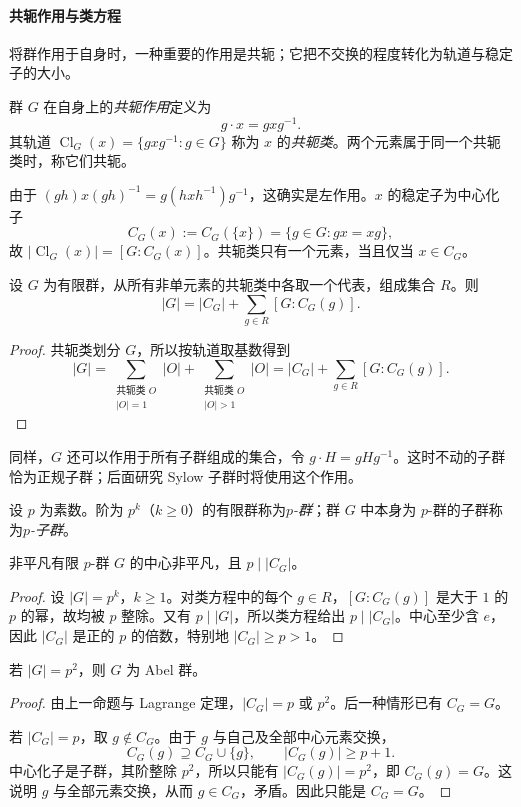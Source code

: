 \documentclass[lang=cn,a4paper,fontset=none,zihao=false,10pt,openany,twoside]{beautybook}
\numberwithin{algorithm}{chapter}
\begin{document}
\paragraph{共轭作用与类方程}
将群作用于自身时，一种重要的作用是共轭；它把不交换的程度转化为轨道与稳定子的大小。
\begin{definition}[共轭与共轭类]
群 $G$ 在自身上的\emph{共轭作用}定义为
\[
 g\cdot x=gxg^{-1}.
\]
其轨道 $\operatorname{Cl}_G(x)=\{gxg^{-1}:g\in G\}$ 称为 $x$ 的\emph{共轭类}。两个元素属于同一个共轭类时，称它们共轭。
\end{definition}
由于 $(gh)x(gh)^{-1}=g(hxh^{-1})g^{-1}$，这确实是左作用。$x$ 的稳定子为中心化子
\[
 C_G(x):=C_G(\{x\})=\{g\in G:gx=xg\},
\]
故 $|\operatorname{Cl}_G(x)|=[G:C_G(x)]$。共轭类只有一个元素，当且仅当 $x\in C_G$。

\begin{proposition}[类方程]\label{prop:class-equation}
设 $G$ 为有限群，从所有非单元素的共轭类中各取一个代表，组成集合 $R$。则
\[
 |G|=|C_G|+\sum_{g\in R}[G:C_G(g)].
\]
\end{proposition}
\begin{proof}
共轭类划分 $G$，所以按轨道取基数得到
\[
 |G|=\sum_{\substack{\text{共轭类 }O\\|O|=1}}|O|
       +\sum_{\substack{\text{共轭类 }O\\|O|>1}}|O|
     =|C_G|+\sum_{g\in R}[G:C_G(g)].
\]
\end{proof}
同样，$G$ 还可以作用于所有子群组成的集合，令 $g\cdot H=gHg^{-1}$。这时不动的子群恰为正规子群；后面研究 Sylow 子群时将使用这个作用。

\begin{definition}[$p$-群与 $p$-子群]
设 $p$ 为素数。阶为 $p^k$（$k\ge0$）的有限群称为\emph{$p$-群}；群 $G$ 中本身为 $p$-群的子群称为\emph{$p$-子群}。
\end{definition}
\begin{proposition}[$p$-群的中心]\label{prop:p-group-center}
非平凡有限 $p$-群 $G$ 的中心非平凡，且 $p\mid|C_G|$。
\end{proposition}
\begin{proof}
设 $|G|=p^k$，$k\ge1$。对类方程中的每个 $g\in R$，$[G:C_G(g)]$ 是大于 $1$ 的 $p$ 的幂，故均被 $p$ 整除。又有 $p\mid|G|$，所以类方程给出 $p\mid|C_G|$。中心至少含 $e$，因此 $|C_G|$ 是正的 $p$ 的倍数，特别地 $|C_G|\ge p>1$。
\end{proof}
\begin{proposition}[$p^2$ 阶群]
若 $|G|=p^2$，则 $G$ 为 Abel 群。
\end{proposition}
\begin{proof}
由上一命题与 Lagrange 定理，$|C_G|=p$ 或 $p^2$。后一种情形已有 $C_G=G$。

若 $|C_G|=p$，取 $g\notin C_G$。由于 $g$ 与自己及全部中心元素交换，
\[
 C_G(g)\supseteq C_G\cup\{g\},\qquad |C_G(g)|\ge p+1.
\]
中心化子是子群，其阶整除 $p^2$，所以只能有 $|C_G(g)|=p^2$，即 $C_G(g)=G$。这说明 $g$ 与全部元素交换，从而 $g\in C_G$，矛盾。因此只能是 $C_G=G$。
\end{proof}
\end{document}
